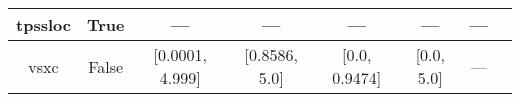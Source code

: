 \begin{tabular}{|c|c|c|c|c|c|c|l|}
      tpssloc &                  True &              --- &              --- &           --- &            --- &        --- &                                                       \cite{Constantin2012_035130} \\ \hline
         vsxc &                 False &  [0.0001, 4.999] &    [0.8586, 5.0] & [0.0, 0.9474] &     [0.0, 5.0] &        --- &                                                          \cite{VanVoorhis1998_400} \\ \hline
\end{tabular}
